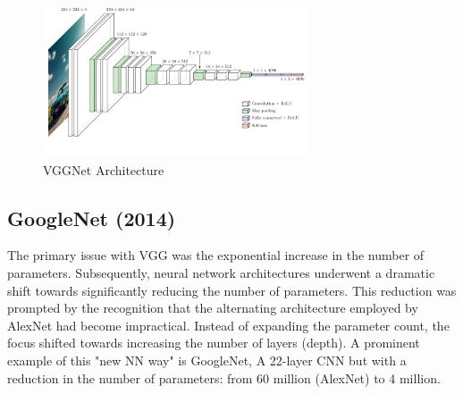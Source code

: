 \begin{figure}[!htbp]
    \centering
    \includegraphics[width=0.7\textwidth]{tikz/chapter5 - VGGNet.pdf}
    \caption{VGGNet Architecture}
\end{figure}

\subsection{GoogleNet (2014)}
The primary issue with VGG was the exponential increase in the number of parameters. Subsequently, neural network architectures underwent a dramatic shift towards significantly reducing the number of parameters. This reduction was prompted by the recognition that the alternating architecture employed by AlexNet had become impractical. Instead of expanding the parameter count, the focus shifted towards increasing the number of layers (depth). A prominent example of this "new NN way" is GoogleNet, A 22-layer CNN but with a reduction in the number of parameters: from 60
million (AlexNet) to 4 million.

